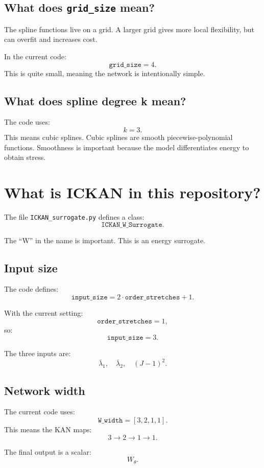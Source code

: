 \documentclass[11pt]{article}
\begin{document}
\subsection{What does \texttt{grid\_size} mean?}

The spline functions live on a grid. A larger grid gives more local flexibility,
but can overfit and increases cost.

In the current code:
\[
  \texttt{grid\_size}=4.
\]
This is quite small, meaning the network is intentionally simple.

\subsection{What does spline degree k mean?}

The code uses:
\[
  k=3.
\]
This means cubic splines. Cubic splines are smooth piecewise-polynomial
functions. Smoothness is important because the model differentiates energy to
obtain stress.

\section{What is ICKAN in this repository?}

The file \texttt{ICKAN\_surrogate.py} defines a class:
\[
  \texttt{ICKAN\_W\_Surrogate}.
\]

The ``W'' in the name is important. This is an energy surrogate.

\subsection{Input size}

The code defines:
\[
  \texttt{input\_size}=2\cdot\texttt{order\_stretches}+1.
\]

With the current setting:
\[
  \texttt{order\_stretches}=1,
\]
so:
\[
  \texttt{input\_size}=3.
\]

The three inputs are:
\[
  \bar{\lambda}_1,\quad
  \bar{\lambda}_2,\quad
  (J-1)^2.
\]

\subsection{Network width}

The current code uses:
\[
  \texttt{W\_width}=[3,2,1,1].
\]
This means the KAN maps:
\[
  3 \longrightarrow 2 \longrightarrow 1 \longrightarrow 1.
\]

The final output is a scalar:
\[
  W_{\theta}.
\]
\end{document}
